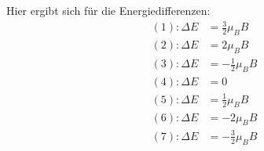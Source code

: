             Hier ergibt sich für die Energiedifferenzen:
            \begin{align}
                (1): \Delta E&=\frac{3}{2}\mu_BB \\
                (2): \Delta E&=2\mu_BB \\
                (3): \Delta E&=-\frac{1}{2}\mu_BB \\
                (4): \Delta E&=0 \\
                (5): \Delta E&=\frac{1}{2}\mu_BB \\
                (6): \Delta E&=-2\mu_BB \\
                (7): \Delta E&=-\frac{3}{2}\mu_BB \\                
            \end{align}


